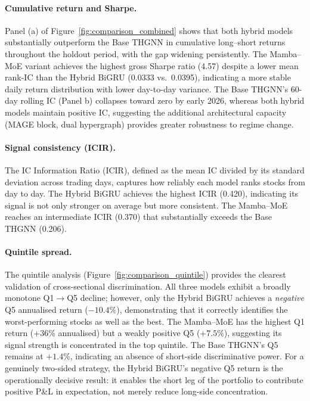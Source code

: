 \documentclass[a4paper,11pt]{report}
\begin{document}
\paragraph{Cumulative return and Sharpe.}
Panel (a) of Figure~\ref{fig:comparison_combined} shows that both hybrid models substantially outperform the Base THGNN in cumulative long--short returns throughout the holdout period, with the gap widening persistently. The Mamba--MoE variant achieves the highest gross Sharpe ratio (4.57) despite a lower mean rank-IC than the Hybrid BiGRU (0.0333 vs.\ 0.0395), indicating a more stable daily return distribution with lower day-to-day variance. The Base THGNN's 60-day rolling IC (Panel b) collapses toward zero by early 2026, whereas both hybrid models maintain positive IC, suggesting the additional architectural capacity (MAGE block, dual hypergraph) provides greater robustness to regime change.

\paragraph{Signal consistency (ICIR).}
The IC Information Ratio (ICIR), defined as the mean IC divided by its standard deviation across trading days, captures how reliably each model ranks stocks from day to day. The Hybrid BiGRU achieves the highest ICIR (0.420), indicating its signal is not only stronger on average but more consistent. The Mamba--MoE reaches an intermediate ICIR (0.370) that substantially exceeds the Base THGNN (0.206).
\paragraph{Quintile spread.}
The quintile analysis (Figure~\ref{fig:comparison_quintile}) provides the clearest validation of cross-sectional discrimination. All three models exhibit a broadly monotone Q1$\to$Q5 decline; however, only the Hybrid BiGRU achieves a \emph{negative} Q5 annualised return ($-10.4\%$), demonstrating that it correctly identifies the worst-performing stocks as well as the best. The Mamba--MoE has the highest Q1 return ($+36\%$ annualised) but a weakly positive Q5 ($+7.5\%$), suggesting its signal strength is concentrated in the top quintile. The Base THGNN's Q5 remains at $+1.4\%$, indicating an absence of short-side discriminative power. For a genuinely two-sided strategy, the Hybrid BiGRU's negative Q5 return is the operationally decisive result: it enables the short leg of the portfolio to contribute positive P\&L in expectation, not merely reduce long-side concentration.
\end{document}
